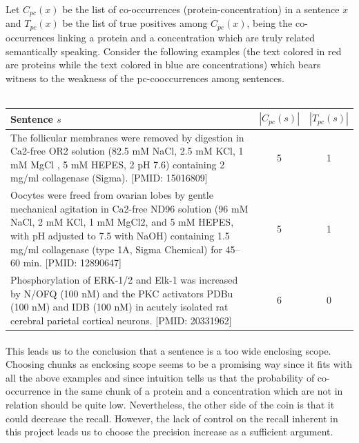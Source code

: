 \documentclass{report}
\begin{document}
		Let $C_{pc}(x)$ be the list of co-occurrences (protein-concentration) in a sentence $x$ and $T_{pc}(x)$ be the list of true positives among $C_{pc}(x)$, being the co-occurrences
		linking a protein and a concentration which are truly related 
		semantically speaking. 
		Consider the following examples (the text colored in red are proteins while the text colored in blue are concentrations) which bears witness 
		to the weakness of the pc-cooccurrences among sentences.\\\\
		\begin{tabularx}{\textwidth}{X|c|c}
		Sentence $s$ & $|C_{pc}(s)|$ & $|T_{pc}(s)|$\\
		\hline
		The follicular membranes were removed by digestion in Ca2-free OR2 solution ({\color{blue}82.5 mM} NaCl, {\color{blue}2.5 mM} KCl, {\color{blue}1 mM} MgCl , {\color{blue}5 mM} HEPES, 2 pH 7.6) containing {\color{blue}2 mg/ml} {\color{red}collagenase} (Sigma). [PMID: 15016809] & 5 & 1\\
		
		\hline
		Oocytes were freed from ovarian lobes by gentle mechanical agitation in Ca2-free ND96 solution ({\color{blue}96 mM} NaCl, {\color{blue}2 mM} KCl, {\color{blue}1 mM} MgCl2, and {\color{blue}5 mM} HEPES, with pH adjusted to 7.5 with NaOH) containing {\color{blue}1.5 mg/ml} {\color{red}collagenase} (type 1A, Sigma Chemical) for 45–60 min. [PMID: 12890647] & 5 & 1\\
		
		\hline
		Phosphorylation of {\color{red}ERK-1/2} and {\color{red}Elk-1} was increased by N/OFQ ({\color{blue}100 nM}) and the PKC activators PDBu ({\color{blue}100 nM}) and IDB ({\color{blue}100 nM}) in acutely isolated rat cerebral parietal cortical neurons. [PMID: 20331962] & 6 & 0
		\end{tabularx}
		\paragraph{}
		This leads us to the
		conclusion that a sentence is a too wide enclosing scope. Choosing chunks as enclosing scope seems to be a promising 
		way since it fits with all the above examples and since intuition tells us that the
		probability of co-occurrence in the same 
		chunk of a protein and a concentration which are not in relation should 
		be quite low. 
		Nevertheless, the other side of the coin is that it could decrease 
		the recall. However, the lack of control on
		the recall inherent in this project leads us to choose the precision increase
		as a sufficient argument.
\end{document}
